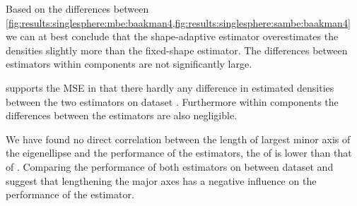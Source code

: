 		Based on the differences between \cref{fig:results:singlesphere:mbe:baakman4,fig:results:singlesphere:sambe:baakman4} we can at best conclude that the shape-adaptive estimator overestimates the densities slightly more than the fixed-shape estimator. 
		The differences between estimators within components are not significantly large.

		 supports the MSE in that there hardly any difference in estimated densities between the two estimators on dataset \baakmanFive. 
		Furthermore within components the differences between the estimators are also negligible. 

		We have found no direct correlation between the length of largest minor axis of the eigenellipse and the performance of the estimators, \eg the \MSE of \baakmanFour is lower than that of \baakmanOne. Comparing the performance of both estimators on between dataset \ferdosiOne and \baakmanFive suggest that lengthening the major axes has a negative influence on the performance of the estimator. 
